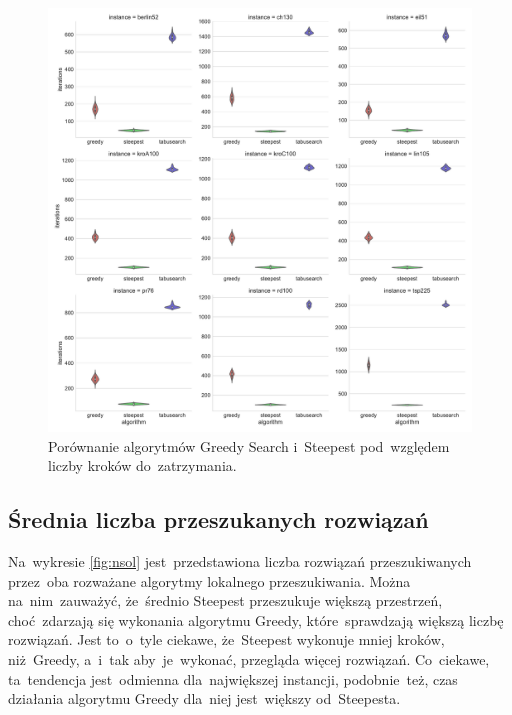 \begin{figure}[H]
\begin{center}
\includegraphics[width=1.0\textwidth]{graphs/iterations_comparison_violin.pdf}
\end{center}
\caption{Porównanie algorytmów Greedy Search i~Steepest pod~względem liczby kroków do~zatrzymania.}
\label{fig:steps}
\end{figure}

\subsection{Średnia liczba przeszukanych rozwiązań}

Na~wykresie \ref{fig:nsol} jest~przedstawiona liczba rozwiązań przeszukiwanych przez~oba rozważane algorytmy lokalnego przeszukiwania. Można na~nim~zauważyć, że~średnio Steepest przeszukuje większą przestrzeń, choć~zdarzają się wykonania algorytmu Greedy, które~sprawdzają większą liczbę rozwiązań. Jest to~o~tyle ciekawe, że~Steepest wykonuje mniej kroków, niż~Greedy, a~i~tak aby~je~wykonać, przegląda więcej rozwiązań. Co~ciekawe, ta~tendencja jest~odmienna dla~największej instancji, podobnie~też, czas działania algorytmu Greedy dla~niej jest~większy od~Steepesta.

